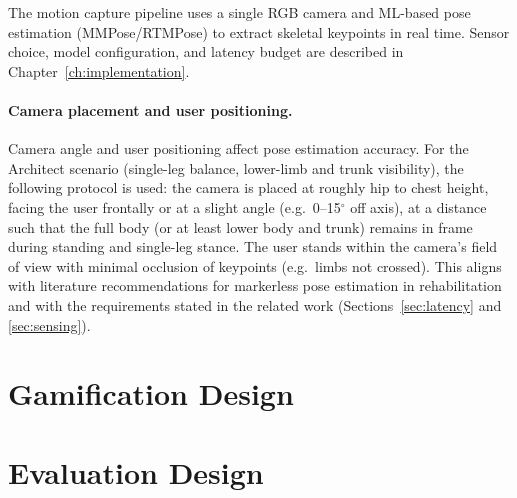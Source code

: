 The motion capture pipeline uses a single RGB camera and ML-based pose estimation (MMPose/RTMPose) to extract skeletal keypoints in real time. Sensor choice, model configuration, and latency budget are described in Chapter~\ref{ch:implementation}.

\paragraph{Camera placement and user positioning.}
Camera angle and user positioning affect pose estimation accuracy. For the Architect scenario (single-leg balance, lower-limb and trunk visibility), the following protocol is used: the camera is placed at roughly hip to chest height, facing the user frontally or at a slight angle (e.g.\ 0--15$^\circ$ off axis), at a distance such that the full body (or at least lower body and trunk) remains in frame during standing and single-leg stance. The user stands within the camera's field of view with minimal occlusion of keypoints (e.g.\ limbs not crossed). This aligns with literature recommendations for markerless pose estimation in rehabilitation \cite{francia2024mediapipe, plavoukou2025sensors} and with the requirements stated in the related work (Sections~\ref{sec:latency} and \ref{sec:sensing}).

\section{Gamification Design}

\section{Evaluation Design}
